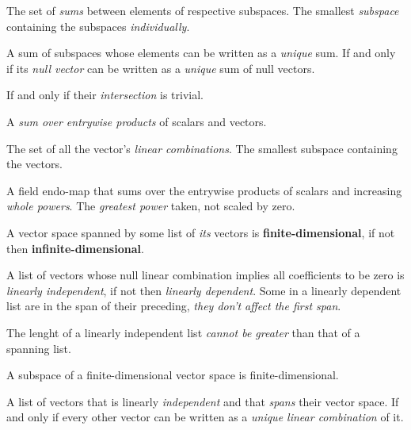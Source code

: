 \begin{multicols}{3}
  The set of \textit{sums} between elements of respective subspaces.
  The smallest \textit{subspace} containing the subspaces \textit{individually}.

  A sum of subspaces whose elements can be written as a \textit{unique} sum.
  If and only if its \textit{null vector} can be written as a \textit{unique} sum of null vectors.

  If and only if their \textit{intersection} is trivial.

  A \textit{sum over entrywise products} of scalars and vectors.
  
  The set of all the vector's \textit{linear combinations}.
  The smallest subspace containing the vectors.

  A field endo-map that sums over the entrywise products of scalars and increasing \textit{whole powers}.
  The \textit{greatest power} taken, not scaled by zero.
  
  A vector space spanned by some list of \textit{its} vectors
  is \textbf{finite-dimensional},
  if not then \textbf{infinite-dimensional}.
  
  A list of vectors whose null linear combination implies all coefficients to be zero is \textit{linearly independent},
  if not then \textit{linearly dependent}.
  Some in a linearly dependent list are in the span of their preceding, \textit{they don't affect the first span}.
  
  The lenght of a linearly independent list \textit{cannot be greater} than that of a spanning list.
  
  A subspace of a finite-dimensional vector space is finite-dimensional.
  
  A list of vectors that is linearly \textit{independent} and that \textit{spans} their vector space.
  If and only if every other vector can be written as a \textit{unique linear combination} of it.
  

\end{multicols}

